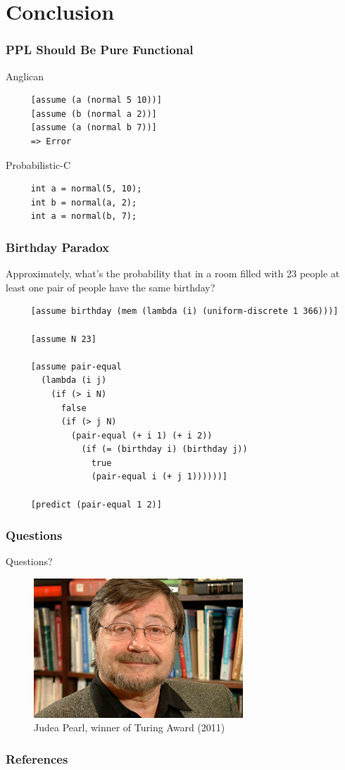 \documentclass[usenames,dvipsnames]{beamer}
\begin{document}
\section{Conclusion}
\begin{frame}[fragile]
  \frametitle{PPL Should Be Pure Functional}
  Anglican
  \begin{verbatim}
     [assume (a (normal 5 10))]
     [assume (b (normal a 2))]
     [assume (a (normal b 7))]
     => Error
  \end{verbatim}
  Probabilistic-C
  \begin{verbatim}
     int a = normal(5, 10);
     int b = normal(a, 2);
     int a = normal(b, 7);
  \end{verbatim}
\end{frame}
\begin{frame}[fragile]
  \frametitle{Birthday Paradox}
  Approximately, what's the probability that in a room filled with 23 people at
  least one pair of people have the same birthday?
  \begin{verbatim}
     [assume birthday (mem (lambda (i) (uniform-discrete 1 366)))]

     [assume N 23]

     [assume pair-equal
       (lambda (i j)
         (if (> i N)
           false
           (if (> j N)
             (pair-equal (+ i 1) (+ i 2))
               (if (= (birthday i) (birthday j))
                 true
                 (pair-equal i (+ j 1))))))]

     [predict (pair-equal 1 2)]
  \end{verbatim}
\end{frame}
\begin{frame}
  \frametitle{Questions}
  \begin{center}
    \Huge{Questions?}
  \end{center}
  \begin{figure}
    \centering
    \includegraphics[width=0.7\textwidth, height=0.6\textheight]{figures/judeapearl.png}
    \caption*{Judea Pearl, winner of Turing Award (2011)}
  \end{figure}
\end{frame}
\begin{frame}[allowframebreaks]
  \frametitle{References}
  \printbibliography{}
\end{frame}
\end{document}
